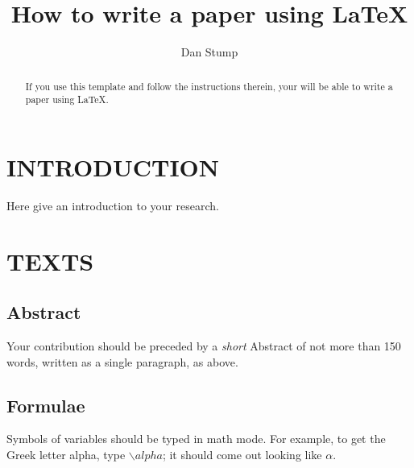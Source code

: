 \documentclass[dvips]{article}
\begin{document}
\title{How to write a paper using LaTeX}
 
\author{Dan Stump}
 
%
%
%
 
\maketitle %
 
\begin{abstract}
If you use this template and follow the instructions therein,
your will be able to write a paper using LaTeX.
\end{abstract}
 
\section{INTRODUCTION}

Here give an introduction to your research.

\section{TEXTS}
 
\subsection{Abstract}

Your contribution should  be preceded by a {\it short} Abstract
of not more than 150 words,
written as a single paragraph, as above.

\subsection{Formulae}

Symbols of variables should  be typed in math mode.
For example, to get the Greek letter alpha,
type $\backslash{alpha}$; it should come out looking
like $\alpha$.
\end{document}
